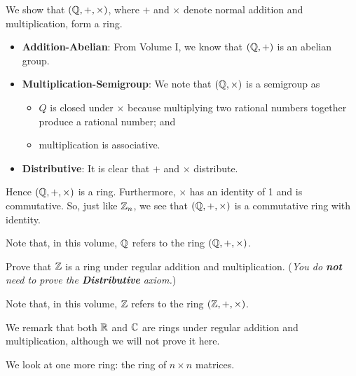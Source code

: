 \begin{example}
    We show that $(\mathbb{Q}, +, \times)$, where $+$ and $\times$ denote normal addition and multiplication, form a ring.
    \begin{itemize}
        \item \textbf{Addition-Abelian}: From Volume I, we know that $(\mathbb{Q}, +)$ is an abelian group.
        \item \textbf{Multiplication-Semigroup}: We note that $(\mathbb{Q}, \times)$ is a semigroup as
        \begin{itemize}
            \item $Q$ is closed under $\times$ because multiplying two rational numbers together produce a rational number; and
            \item multiplication is associative.
        \end{itemize}
        \item \textbf{Distributive}: It is clear that $+$ and $\times$ distribute.
    \end{itemize}
    Hence $(\mathbb{Q}, +, \times)$ is a ring. Furthermore, $\times$ has an identity of 1 and is commutative. So, just like $\mathbb{Z}_n$, we see that $(\mathbb{Q}, +, \times)$ is a commutative ring with identity.

    Note that, in this volume, $\mathbb{Q}$ refers to the ring $(\mathbb{Q}, +, \times)$.
\end{example}

\begin{exercise}
    Prove that $\mathbb{Z}$ is a ring under regular addition and multiplication.\newline
    (\textit{You do \textbf{not} need to prove the \textbf{Distributive} axiom.})
\end{exercise}
Note that, in this volume, $\mathbb{Z}$ refers to the ring $(\mathbb{Z}, +, \times)$.

We remark that both $\mathbb{R}$ and $\mathbb{C}$ are rings under regular addition and multiplication, although we will not prove it here.

We look at one more ring: the ring of $n \times n$ matrices.


